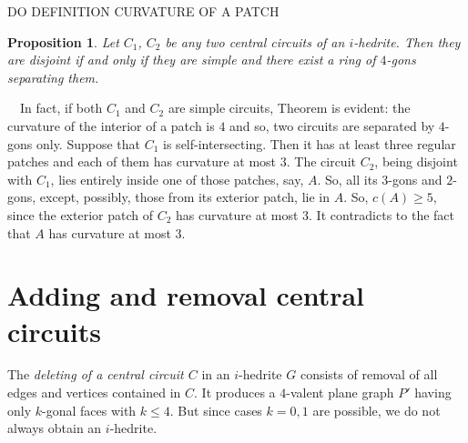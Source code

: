 \documentclass[12pt]{article}
\newtheorem{proposition}{Proposition}
\newcommand{\proof}{\noindent{\bf Proof.}\ \ }
\begin{document}
DO DEFINITION CURVATURE OF A PATCH



\begin{proposition}\label{intersec}
Let $C_1$, $C_2$ be any two central circuits of an $i$-hedrite. Then 
they are disjoint if and only if they are simple and there exist a 
ring of $4$-gons separating them.

\end{proposition}
\proof In fact, if both $C_1$ and $C_2$ are simple circuits, Theorem 
is evident: the curvature of the interior of a patch is $4$ and so, two
circuits are separated by $4$-gons only. Suppose that $C_1$ is 
self-intersecting. Then it has at least three regular patches and each 
of them has curvature at most $3$.
The circuit $C_2$, being disjoint with $C_1$, lies entirely inside one 
of those patches, say, $A$. So, all its $3$-gons and $2$-gons, except, 
possibly, those from its exterior patch, lie in $A$. So, $c(A)\geq 5$,
since the exterior patch of $C_2$ has curvature at most $3$.
It contradicts to the fact that $A$ has curvature at most $3$. 








\section{Adding and removal central circuits}


%
%
%
%
%


The {\em deleting of a central circuit $C$} in an $i$-hedrite $G$ consists 
of removal of all edges and vertices contained in $C$. It produces a 
$4$-valent plane graph $P'$ having only $k$-gonal faces 
with $k \leq 4$. But since cases $k=0,1$ are possible, we do not
always obtain an $i$-hedrite.
\end{document}
